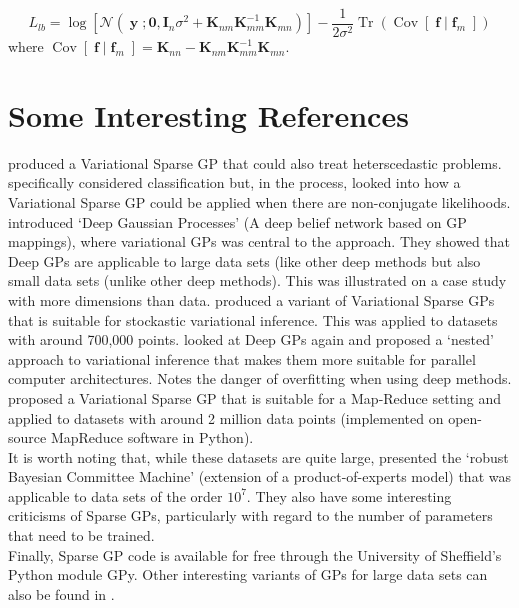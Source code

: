 \documentclass[a4paper, 11pt]{article}
\DeclareMathOperator{\Cov}{Cov}
\DeclareMathOperator{\Tr}{Tr}
\DeclareMathOperator{\y}{\boldsymbol{y}}
\DeclareMathOperator{\f}{\boldsymbol{f}}
\begin{document}
\begin{equation}
	L_{lb} = \log \left[ \mathcal{N}(\y; \boldsymbol{0}, \boldsymbol{I}_n\sigma^2 + \boldsymbol{K}_{nm}\boldsymbol{K}_{mm}^{-1}\boldsymbol{K}_{mn}) \right] -\frac{1}{2\sigma^2} \Tr\left(  \Cov[\f|\f_m] \right)
\end{equation}
where $\Cov[\f|\f_m] = \boldsymbol{K}_{nn} - \boldsymbol{K}_{nm}\boldsymbol{K}_{mm}^{-1}\boldsymbol{K}_{mn}$. 


\section{Some Interesting References}\label{sec:refs}
\cite{Lazaro-Gredilla2011} produced a Variational Sparse GP that could also treat heterscedastic problems. \cite{Chai2012} specifically considered classification but, in the process, looked into how a Variational Sparse GP could be applied when there are non-conjugate likelihoods. \cite{Damianou2012} introduced `Deep Gaussian Processes' (A deep belief network based on GP mappings), where variational GPs was central to the approach. They showed that Deep GPs are applicable to large data sets (like other deep methods but also small data sets (unlike other deep methods). This was illustrated on a case study with more dimensions than data. \cite{Hensman2013} produced a variant of Variational Sparse GPs that is suitable for stockastic variational inference. This was applied to datasets with around 700,000 points. \cite{Hensman2014} looked at Deep GPs again and proposed a `nested' approach to variational inference that makes them more suitable for parallel computer architectures. Notes the danger of overfitting when using deep methods. \cite{Gal2014} proposed a Variational Sparse GP that is suitable for a Map-Reduce setting and applied to datasets with around 2 million data points (implemented on open-source MapReduce software in Python). \\

It is worth noting that, while these datasets are quite large, \cite{Deisenroth2015} presented the `robust Bayesian Committee Machine' (extension of a product-of-experts model) that was applicable to data sets of the order $10^7$. They also have some interesting criticisms of Sparse GPs, particularly with regard to the number of parameters that need to be trained. \\

Finally, Sparse GP code is available for free through the University of Sheffield's Python module GPy. Other interesting variants of GPs for large data sets can also be found in \cite{Wilson2015}\cite{Wilson2015a}. \\
\end{document}
